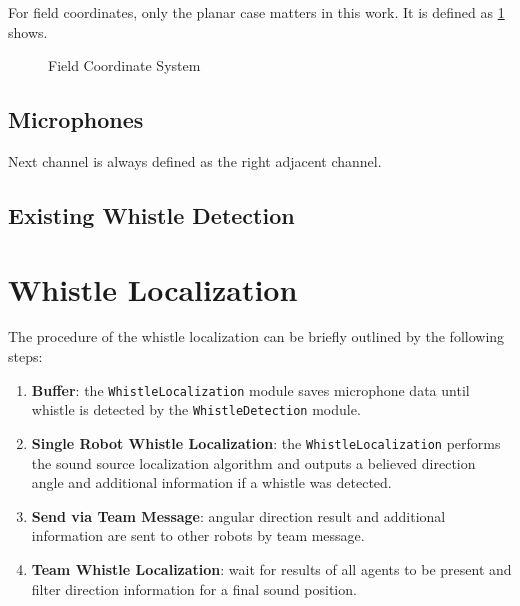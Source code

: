 For field coordinates, only the planar case matters in this work.
It is defined as \cref{fig:03_fieldCoordinates} shows.
\begin{figure}[ht]
	\centering
	\caption{Field Coordinate System}
	\label{fig:03_fieldCoordinates}
\end{figure}


\subsection{Microphones}
\label{subsec:03_microphones}

Next channel is always defined as the right adjacent channel.

\subsection{Existing Whistle Detection}
\label{subsec:03_whistleDetection}



\section{Whistle Localization}
\label{sec:03_whistleLocalization}

The procedure of the whistle localization can be briefly outlined by
the following steps:
\begin{enumerate}
    \item \textbf{Buffer}: the \lstinline!WhistleLocalization! module saves microphone
          data until whistle is detected by the \lstinline!WhistleDetection! module.
    \item \textbf{Single Robot Whistle Localization}: the \lstinline!WhistleLocalization!
          performs the sound source localization algorithm and outputs a
          believed direction angle and additional information if a whistle was detected.
    \item \textbf{Send via Team Message}: angular direction result and additional information
          are sent to other robots by team message.
    \item \textbf{Team Whistle Localization}: wait for results of all agents to be present
          and filter direction information for a final sound position.
\end{enumerate}


